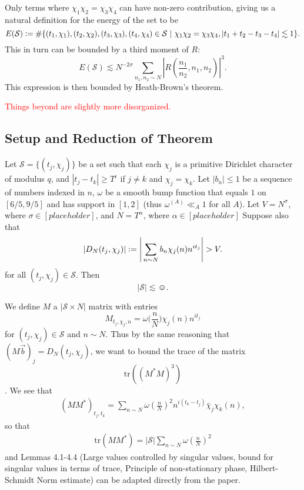 Only terms where $\chi_1\chi_2=\chi_3\chi_4$ can have non-zero contribution, giving us a natural definition for the energy of the set to be \[
E(\mathcal{S})\defeq \#\{(t_1,\chi_1),(t_2,\chi_2),(t_3,\chi_3),(t_4,\chi_4)\in \mathcal{S} \ | \ \chi_1\chi_2=\chi_3\chi_4, |t_1+t_2-t_3-t_4|\lesssim 1\}.
\]
This in turn can be bounded by a third moment of $R$: \[
 E(\mathcal{S})\lesssim N^{-2\sigma}\sum_{n_1,n_2\sim N}\left|R\left(\frac{n_1}{n_2},n_1,n_2\right) \right|^3.\]
 This expression is then bounded by Heath-Brown's theorem.



 \textcolor{red}{Things beyond are slightly more disorganized.}
\subsection{Setup and Reduction of Theorem}
\begin{lemma}
    Let $\mathcal{S}=\{(t_j,\chi_j)\}$ be a set such that each $\chi_j$ is a primitive Dirichlet character of modulus $q$, and $|t_j-t_k|\geq T^\epsilon$ if $j\neq k$ and $\chi_j=\chi_k$. Let $|b_n|\leq 1$ be a sequence of numbers indexed in $n$, $\omega$ be a smooth bump function that equals $1$ on $[6/5,9/5]$ and has support in $[1,2]$ (thus $\omega^{(A)}\ll_A 1$ for all $A$). Let $V=N^\sigma$, where $\sigma \in [placeholder]$, and $N=T^\alpha$, where $\alpha \in [placeholder]$ Suppose also that \[
    |D_N(t_j,\chi_j)|\defeq\Bigg|\sum_{n\sim N} b_n\chi_j(n)n^{it_j} \Bigg|>V.
\]
for all $(t_j,\chi_j)\in\mathcal{S}$.
Then \[
|\mathcal{S}|\lesssim \smiley.
\]
\end{lemma}

We define $M$ a $|\mathcal{S}\times N|$ matrix with entries
\[
    M_{t_j,\chi_j,n} = \omega\Big(\frac{n}{N}\Big)\chi_j(n)n^{it_j}
\]
for $(t_j,\chi_j)\in\mathcal{S}$ and $n\sim N$.
Thus by the same reasoning that $(M\vec{b})_j=D_N(t_j,\chi_j)$,
we want to bound the trace of the matrix \[
\textrm{tr}((M^*M)^3)
\].
We see that \begin{align*}
    (MM^*)_{t_j,t_k} = \sum_{n\sim N} \omega\left(\frac{n}{N}\right)^2 n^{i(t_k-t_j)}\bar{\chi}_j\chi_k(n),
\end{align*}
so that \begin{align*}
    \textrm{tr}(MM^*) = |\mathcal{S}|\sum_{n\sim N} \omega\left(\frac{n}{N}\right)^2
\end{align*}
and Lemmas 4.1-4.4 (Large values controlled by singular values, bound for singular values in terms of trace,
Principle of non-stationary phase, Hilbert-Schmidt Norm estimate) can be adapted directly from the paper.


